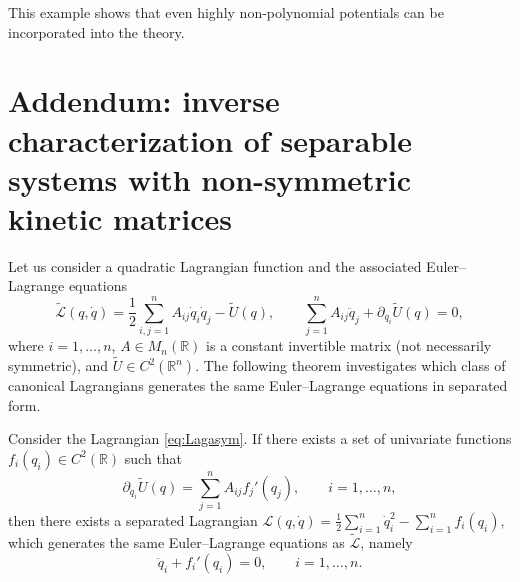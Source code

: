 \documentclass{rendiconti}
\begin{document}
This example shows that even highly non-polynomial potentials can be incorporated into the theory.




\section{Addendum: inverse characterization of separable systems with non-symmetric kinetic matrices}
\label{sec:inv}

Let us consider a quadratic Lagrangian function and the associated
Euler--Lagrange equations
\begin{equation}
\label{eq:Lagasym}
\widetilde{\mathcal L}(q,\dot q)
=\frac{1}{2}\sum_{i,j=1}^n A_{ij}\dot q_i\dot q_j-\widetilde U(q),
\qquad
\sum_{j=1}^n A_{ij}\ddot q_j+\partial_{q_i}\widetilde U(q)=0,
\end{equation} 
where $i=1,\dots,n$, $A\in M_n(\mathbb{R})$ is a constant invertible matrix
(not necessarily symmetric), and
$\widetilde U\in C^2(\mathbb{R}^n)$.
The following theorem investigates which class of canonical Lagrangians
generates the same Euler--Lagrange equations in separated form.
%
\begin{proposition}
Consider the Lagrangian \eqref{eq:Lagasym}.
If there exists a set of univariate functions
$f_i(q_i)\in C^2(\mathbb{R})$ such that
\begin{equation}
\label{eq:condE}
\partial_{q_i}\widetilde U(q)
=
\sum_{j=1}^n A_{ij} f_j'(q_j),
\qquad i=1,\dots,n,
\end{equation}
then there exists a separated Lagrangian
$\mathcal L(q,\dot q)=\frac{1}{2}\sum_{i=1}^n \dot q_i^2-\sum_{i=1}^n f_i(q_i),$
which generates the same Euler--Lagrange equations as
$\widetilde{\mathcal L}$, namely
\begin{equation}
\label{eq:aaa}
\ddot q_i+f_i'(q_i)=0,
\qquad i=1,\dots,n.
\end{equation}
\end{proposition}
\end{document}
